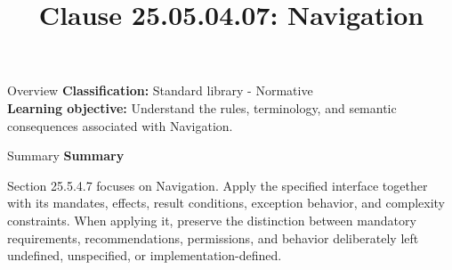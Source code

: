 \documentclass[10pt,letterpaper]{article}
\title{Clause 25.05.04.07: Navigation}
\author{}
\date{}
\begin{document}
\maketitle
\begin{CornellOverviewBox}{Overview}
\textbf{Classification:} Standard library - Normative\\[2pt]
\textbf{Learning objective:} Understand the rules, terminology, and semantic consequences associated with Navigation.
\end{CornellOverviewBox}\begin{CornellSummaryBox}{Summary}
{\sffamily\bfseries\color{Accent} Summary}\par\vspace{3pt}Section 25.5.4.7 focuses on Navigation. Apply the specified interface together with its mandates, effects, result conditions, exception behavior, and complexity constraints. When applying it, preserve the distinction between mandatory requirements, recommendations, permissions, and behavior deliberately left undefined, unspecified, or implementation-defined.
\end{CornellSummaryBox}
\end{document}
